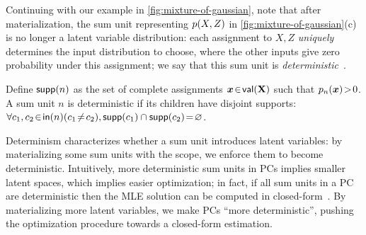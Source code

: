 \documentclass{article} %
\begin{document}

Continuing with our example in \cref{fig:mixture-of-gaussian}, note that after materialization, the sum unit representing ${p}(X, Z)$ in \cref{fig:mixture-of-gaussian}(c) is no longer a latent variable distribution: each assignment to $X, Z$ \emph{uniquely} determines the input distribution to choose, where the other inputs give zero probability under this assignment; we say that this sum unit is \emph{deterministic}~\citep{darwiche2003differential}.
\begin{defn}[Determinism]
Define $\mathsf{supp}(n)$ as the set of complete assignments $\boldsymbol{x} \!\in\! \mathsf{val}(\mathbf{X})$ such that ${p}_{n}(\boldsymbol{x}) \!>\! 0$. A sum unit $n$ is deterministic if its children have disjoint supports: $\forall c_1, c_2 \!\in\! \mathsf{in}(n) (c_1 \!\neq\! c_2), \mathsf{supp}(c_1) \cap \mathsf{supp}(c_2) \!=\! \varnothing$. 
\end{defn}
Determinism characterizes whether a sum unit introduces latent variables: by materializing some sum units with the scope, we enforce them to become deterministic. Intuitively, more deterministic sum units in PCs implies smaller latent spaces, which implies easier optimization; in fact, if all sum units in a PC are deterministic then the MLE solution can be computed in closed-form~\citep{kisa2014probabilistic}. By materializing more latent variables, we make PCs ``more deterministic'', pushing the optimization procedure towards a closed-form estimation.
\end{document}
